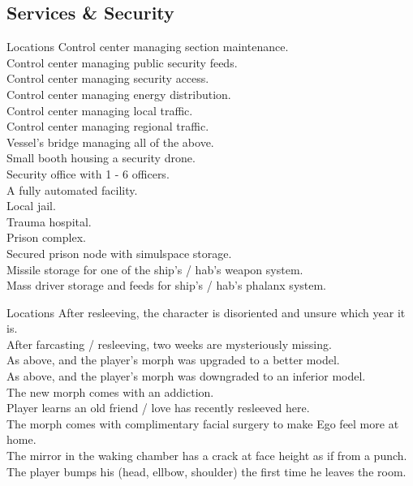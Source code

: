 \documentclass[a4]{book}
\begin{document}
\starttableone
\stoptableone



\subsection*{Services \& Security}

\begin{tableone}{Locations}
Control center managing section maintenance.\\
Control center managing public security feeds.\\
Control center managing security access.\\
Control center managing energy distribution.\\
Control center managing local traffic.\\
Control center managing regional traffic.\\
Vessel's bridge managing all of the above.\\
Small booth housing a security drone.\\
Security office with 1 - 6 officers.\\
A fully automated  facility.\\

Local jail.\\
Trauma hospital.\\
Prison complex.\\
Secured prison node with simulspace storage.\\
Missile storage for one of the ship's / hab's weapon system.\\
Mass driver storage and feeds for ship's / hab's phalanx system.\\
\end{tableone}



\begin{tableone}{Locations}
After resleeving, the character is disoriented and unsure which year it is.\\
After farcasting / resleeving, two weeks are mysteriously missing.\\
As above, and the player's morph was upgraded to a better model.\\
As above, and the player's morph was downgraded to an inferior model.\\
The new morph comes with an addiction.\\
Player learns an old friend / love has recently resleeved here.\\
The morph comes with complimentary facial surgery to make Ego feel more at home.\\
The mirror in the waking chamber has a crack at face height as if from a punch.\\
The player bumps his (head, ellbow, shoulder) the first time he leaves the room.\\
\end{tableone}
\end{document}
